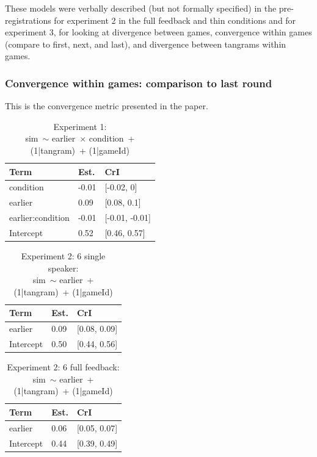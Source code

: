 \documentclass[
  english,
  a4paper,
]{article}
\begin{document}
These models were verbally described (but not formally specified) in the pre-registrations for experiment 2 in the full feedback and thin conditions and for experiment 3, for looking at divergence between games, convergence within games (compare to first, next, and last), and divergence between tangrams within games.

\hypertarget{convergence-within-games-comparison-to-last-round}{%
\subsubsection{Convergence within games: comparison to last round}\label{convergence-within-games-comparison-to-last-round}}

This is the convergence metric presented in the paper.

\begin{table}[h!]

\caption{\label{tab:unnamed-chunk-12}Experiment 1:\\ sim~$\sim$ earlier~$\times$ condition~+ (1|tangram)~+ (1|gameId)}
\centering
\begin{tabular}[t]{lll}
\toprule
Term & Est. & CrI\\
\midrule
condition & -0.01 & {}[-0.02, 0]\\
earlier & 0.09 & {}[0.08, 0.1]\\
earlier:condition & -0.01 & {}[-0.01, -0.01]\\
Intercept & 0.52 & {}[0.46, 0.57]\\
\bottomrule
\end{tabular}
\end{table}

\begin{table}[h!]

\caption{\label{tab:unnamed-chunk-12}Experiment 2: 6 single speaker:\\ sim~$\sim$ earlier~+ (1|tangram)~+ (1|gameId)}
\centering
\begin{tabular}[t]{lll}
\toprule
Term & Est. & CrI\\
\midrule
earlier & 0.09 & {}[0.08, 0.09]\\
Intercept & 0.50 & {}[0.44, 0.56]\\
\bottomrule
\end{tabular}
\end{table}

\begin{table}[h!]

\caption{\label{tab:unnamed-chunk-12}Experiment 2: 6 full feedback:\\ sim~$\sim$ earlier~+ (1|tangram)~+ (1|gameId)}
\centering
\begin{tabular}[t]{lll}
\toprule
Term & Est. & CrI\\
\midrule
earlier & 0.06 & {}[0.05, 0.07]\\
Intercept & 0.44 & {}[0.39, 0.49]\\
\bottomrule
\end{tabular}
\end{table}
\end{document}
